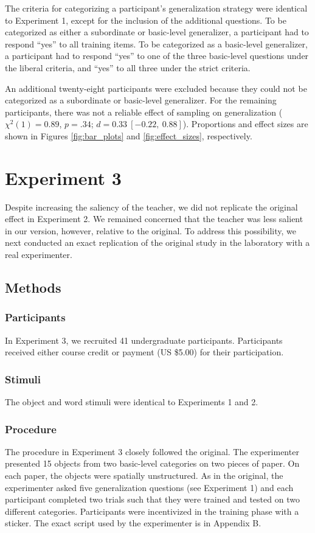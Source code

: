 \documentclass[man]{apa2}
\begin{document}
The criteria for categorizing a participant's generalization strategy were identical to Experiment 1, except for the inclusion of the additional questions. To be categorized as either a subordinate or basic-level generalizer, a participant had to respond ``yes'' to all training items. To be categorized as a basic-level generalizer, a participant had to respond ``yes'' to one of the three basic-level questions under the liberal criteria, and ``yes'' to all three under the strict criteria. 

An additional twenty-eight participants were excluded because they could not be categorized as a subordinate or basic-level generalizer. For the remaining participants, there was not a reliable effect of sampling on generalization ($\chi^2(1) = 0.89$, $p = .34$; $d = 0.33\ [-0.22,\ 0.88]$). Proportions and effect sizes are shown in Figures \ref{fig:bar_plots} and \ref{fig:effect_sizes}, respectively.

\section{Experiment 3}
Despite increasing the saliency of the teacher, we did not replicate the original effect in Experiment 2. We remained concerned that the teacher was less salient in our version, however, relative to the original. To address this possibility, we next conducted an exact replication of the original study in the laboratory with a real experimenter.

\subsection{Methods}

\subsubsection{Participants} In Experiment 3, we recruited 41 undergraduate participants. Participants received either course credit or payment (US \$5.00) for their participation. 

\subsubsection{Stimuli}
The object and word stimuli were identical to Experiments 1 and 2. 

\subsubsection{Procedure}
The procedure in Experiment 3 closely followed the original. The experimenter presented 15 objects from two basic-level categories on two pieces of paper. On each paper, the objects were spatially unstructured. As in the original, the experimenter asked five generalization questions (see Experiment 1) and each participant completed two trials such that they were trained and tested on two different categories. Participants were incentivized in the training phase with a sticker. The exact script used by the experimenter is in Appendix B. 
\end{document}
